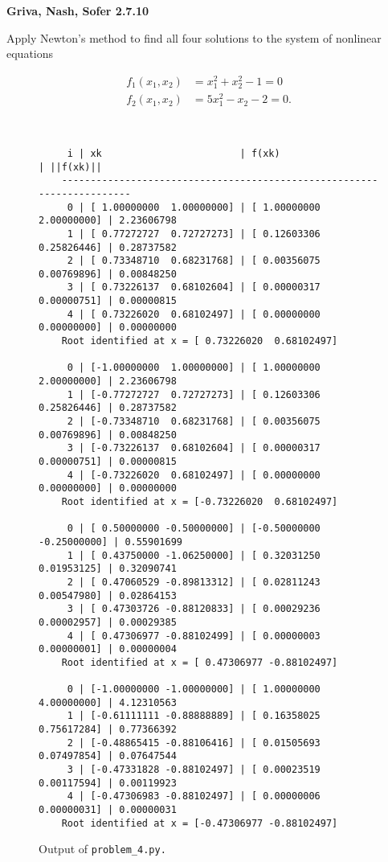 \textbf{Griva, Nash, Sofer 2.7.10}

Apply Newton's method to find all four solutions to the system of nonlinear equations

\begin{align*}
  f_1(x_1, x_2) &= x_1^2 + x_2^2 - 1 = 0 \\
  f_2(x_1, x_2) &= 5 x_1^2 - x_2 - 2 = 0.
\end{align*}

\begin{solution}
  \ \\
  \small
  \begin{figure}[h]
    \begin{verbatim}
     i | xk                        | f(xk)                     | ||f(xk)||
    -----------------------------------------------------------------------
     0 | [ 1.00000000  1.00000000] | [ 1.00000000  2.00000000] | 2.23606798
     1 | [ 0.77272727  0.72727273] | [ 0.12603306  0.25826446] | 0.28737582
     2 | [ 0.73348710  0.68231768] | [ 0.00356075  0.00769896] | 0.00848250
     3 | [ 0.73226137  0.68102604] | [ 0.00000317  0.00000751] | 0.00000815
     4 | [ 0.73226020  0.68102497] | [ 0.00000000  0.00000000] | 0.00000000
    Root identified at x = [ 0.73226020  0.68102497]
    
     0 | [-1.00000000  1.00000000] | [ 1.00000000  2.00000000] | 2.23606798
     1 | [-0.77272727  0.72727273] | [ 0.12603306  0.25826446] | 0.28737582
     2 | [-0.73348710  0.68231768] | [ 0.00356075  0.00769896] | 0.00848250
     3 | [-0.73226137  0.68102604] | [ 0.00000317  0.00000751] | 0.00000815
     4 | [-0.73226020  0.68102497] | [ 0.00000000  0.00000000] | 0.00000000
    Root identified at x = [-0.73226020  0.68102497]
    
     0 | [ 0.50000000 -0.50000000] | [-0.50000000 -0.25000000] | 0.55901699
     1 | [ 0.43750000 -1.06250000] | [ 0.32031250  0.01953125] | 0.32090741
     2 | [ 0.47060529 -0.89813312] | [ 0.02811243  0.00547980] | 0.02864153
     3 | [ 0.47303726 -0.88120833] | [ 0.00029236  0.00002957] | 0.00029385
     4 | [ 0.47306977 -0.88102499] | [ 0.00000003  0.00000001] | 0.00000004
    Root identified at x = [ 0.47306977 -0.88102497]
    
     0 | [-1.00000000 -1.00000000] | [ 1.00000000  4.00000000] | 4.12310563
     1 | [-0.61111111 -0.88888889] | [ 0.16358025  0.75617284] | 0.77366392
     2 | [-0.48865415 -0.88106416] | [ 0.01505693  0.07497854] | 0.07647544
     3 | [-0.47331828 -0.88102497] | [ 0.00023519  0.00117594] | 0.00119923
     4 | [-0.47306983 -0.88102497] | [ 0.00000006  0.00000031] | 0.00000031
    Root identified at x = [-0.47306977 -0.88102497]
    \end{verbatim}
    \caption{Output of \texttt{problem\_4.py.}}
  \end{figure}
  \normalsize
  \ \\
\end{solution}